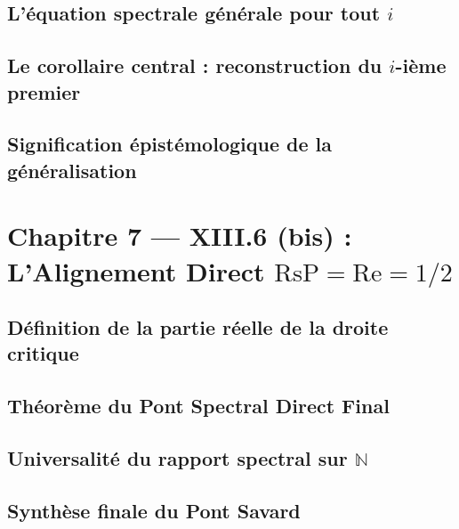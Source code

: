 \documentclass[11pt,a4paper]{article}
\begin{document}
\subsection{L'équation spectrale générale pour tout $i$}
\subsection{Le corollaire central : reconstruction du $i$-ième premier}
\subsection{Signification épistémologique de la généralisation}

\section{Chapitre 7 --- XIII.6 (bis) : L'Alignement Direct $\text{RsP} = \text{Re} = 1/2$}

\subsection{Définition de la partie réelle de la droite critique}
\subsection{Théorème du Pont Spectral Direct Final}
\subsection{Universalité du rapport spectral sur $\mathbb{N}$}
\subsection{Synthèse finale du Pont Savard}
\end{document}
